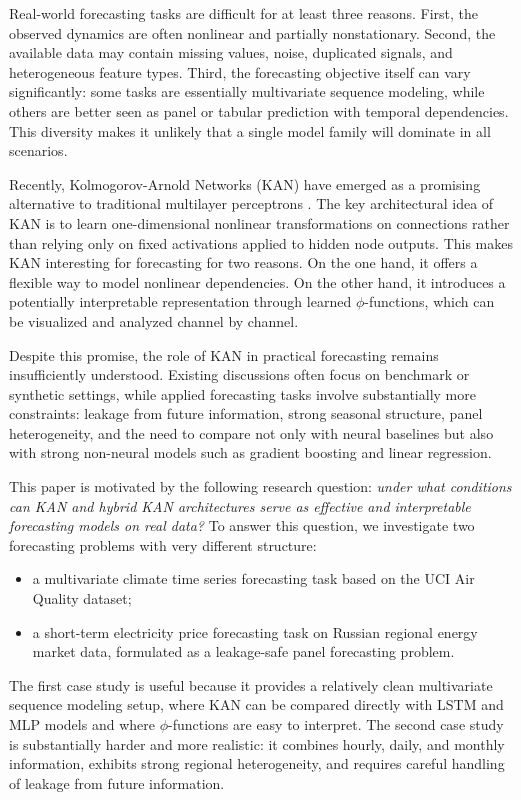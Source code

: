 \documentclass[10pt,conference,onecolumn]{IEEEtran}
\begin{document}
Real-world forecasting tasks are difficult for at least three reasons. First, the observed dynamics are often nonlinear and partially nonstationary. Second, the available data may contain missing values, noise, duplicated signals, and heterogeneous feature types. Third, the forecasting objective itself can vary significantly: some tasks are essentially multivariate sequence modeling, while others are better seen as panel or tabular prediction with temporal dependencies. This diversity makes it unlikely that a single model family will dominate in all scenarios.

Recently, Kolmogorov-Arnold Networks (KAN) have emerged as a promising alternative to traditional multilayer perceptrons \cite{liu2024kan}. The key architectural idea of KAN is to learn one-dimensional nonlinear transformations on connections rather than relying only on fixed activations applied to hidden node outputs. This makes KAN interesting for forecasting for two reasons. On the one hand, it offers a flexible way to model nonlinear dependencies. On the other hand, it introduces a potentially interpretable representation through learned $\phi$-functions, which can be visualized and analyzed channel by channel.

Despite this promise, the role of KAN in practical forecasting remains insufficiently understood. Existing discussions often focus on benchmark or synthetic settings, while applied forecasting tasks involve substantially more constraints: leakage from future information, strong seasonal structure, panel heterogeneity, and the need to compare not only with neural baselines but also with strong non-neural models such as gradient boosting and linear regression.

This paper is motivated by the following research question: \emph{under what conditions can KAN and hybrid KAN architectures serve as effective and interpretable forecasting models on real data?} To answer this question, we investigate two forecasting problems with very different structure:
\begin{itemize}
    \item a multivariate climate time series forecasting task based on the UCI Air Quality dataset;
    \item a short-term electricity price forecasting task on Russian regional energy market data, formulated as a leakage-safe panel forecasting problem.
\end{itemize}

The first case study is useful because it provides a relatively clean multivariate sequence modeling setup, where KAN can be compared directly with LSTM and MLP models and where $\phi$-functions are easy to interpret. The second case study is substantially harder and more realistic: it combines hourly, daily, and monthly information, exhibits strong regional heterogeneity, and requires careful handling of leakage from future information.
\end{document}
